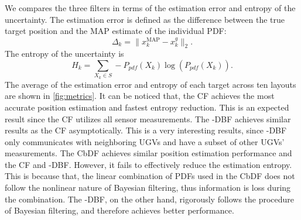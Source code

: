 	We compares the three filters in terms of the estimation error and entropy of the uncertainty.
	The estimation error is defined as the difference between the true target position and the MAP estimate of the individual PDF:
	\small\begin{equation*}
		\Delta_k = \|x^\text{MAP}_k-x^g_k\|_2.
	\end{equation*}\normalsize
	The entropy of the uncertainty is
	\small\begin{equation*}
		H_k = \sum\limits_{X_k\in S} -P_{pdf}(X_k)\log(P_{pdf}(X_k)).
	\end{equation*}\normalsize
	The average of the estimation error and entropy of each target across ten layouts are shown in \cref{fig:metrics}.
	It can be noticed that, the CF achieves the most accurate position estimation and fastest entropy reduction. 
	This is an expected result since the CF utilizes all sensor measurements.
	The \proto-DBF achieves similar results as the CF asymptotically. 
	This is a very interesting results, since \proto-DBF only communicates with neighboring UGVs and have a subset of other UGVs' measurements.
	The CbDF achieves similar position estimation performance and the CF and \proto-DBF. 
	However, it fails to effectively reduce the estimation entropy.
	This is because that, the linear combination of PDFs used in the CbDF does not follow the nonlinear nature of Bayesian filtering, thus information is loss during the combination.
	The \proto-DBF, on the other hand, rigorously follows the procedure of Bayesian filtering, and therefore achieves better performance.
	

